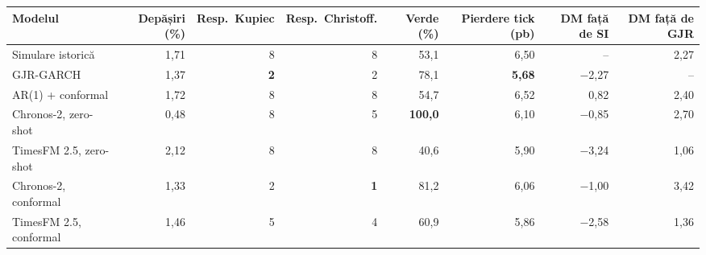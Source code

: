 \begin{tabular}{lrrrrrrr}
\toprule
Modelul & Depășiri (\%) & Resp.\ Kupiec & Resp.\ Christoff. & Verde (\%) & Pierdere tick (pb) & DM față de SI & DM față de GJR \\
\midrule
Simulare istorică & 1,71 & 8 & 8 & 53,1 & 6,50 & -- & 2,27 \\
GJR-GARCH & 1,37 & \textbf{2} & 2 & 78,1 & \textbf{5,68} & $-$2,27 & -- \\
AR(1) + conformal & 1,72 & 8 & 8 & 54,7 & 6,52 & 0,82 & 2,40 \\
Chronos-2, zero-shot & 0,48 & 8 & 5 & \textbf{100,0} & 6,10 & $-$0,85 & 2,70 \\
TimesFM 2.5, zero-shot & 2,12 & 8 & 8 & 40,6 & 5,90 & $-$3,24 & 1,06 \\
Chronos-2, conformal & 1,33 & 2 & \textbf{1} & 81,2 & 6,06 & $-$1,00 & 3,42 \\
TimesFM 2.5, conformal & 1,46 & 5 & 4 & 60,9 & 5,86 & $-$2,58 & 1,36 \\
\bottomrule
\end{tabular}
